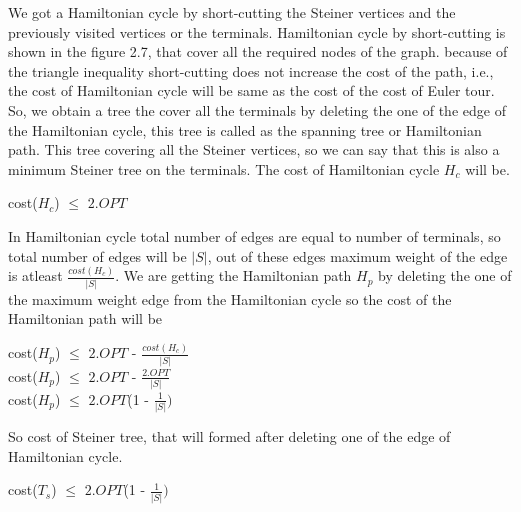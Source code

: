 We got a Hamiltonian cycle by short-cutting the Steiner vertices and the previously visited vertices or the terminals. Hamiltonian cycle by short-cutting is shown in the figure 2.7, that cover all the required nodes of the graph. because of the triangle inequality short-cutting does not increase the cost of the path, i.e., the cost of Hamiltonian cycle will be same as the cost of the cost of Euler tour. So, we obtain a tree the cover all the terminals by deleting the one of the edge of the Hamiltonian cycle, this tree is called as the spanning tree or Hamiltonian path. This tree covering all the Steiner vertices, so we can say that this is also a minimum Steiner tree on the terminals. The cost of Hamiltonian cycle $H_c$ will be. 
\begin{center}
cost($H_c$) $\leq$ $2.OPT$
\end{center} 
In Hamiltonian cycle total number of edges are equal to number of terminals, so total number of edges will be $|S|$, out of these edges maximum weight of the edge is atleast $\frac{cost(H_c)}{|S|}$. We are getting the Hamiltonian path $H_p$ by deleting the one of the maximum weight edge from the Hamiltonian cycle so the cost of the Hamiltonian path will be

\begin{center}
cost($H_p$) $\leq$ $2.OPT$ - $\frac{cost(H_c)}{|S|}$\\
cost($H_p$) $\leq$ $2.OPT$ - $\frac{2.OPT}{|S|}$\\
cost($H_p$) $\leq$ $2.OPT$(1 - $\frac{1}{|S|})$

\end{center} 
So cost of Steiner tree, that will formed after deleting one of the edge of Hamiltonian cycle. 
\begin{center}

cost($T_s$) $\leq$ $2.OPT$(1 - $\frac{1}{|S|})$

\end{center}



